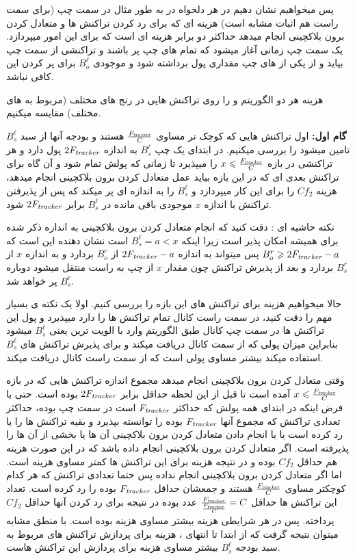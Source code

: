 پس میخواهیم نشان دهیم در هر \epoch دلخواه در  به طور مثال در سمت چپ (برای سمت راست هم اثبات مشابه است) هزینه ای که \on برای رد کردن تراکنش ها و متعادل کردن برون بلاکچینی انجام میدهد حداکثر دو برابر هزینه ای است که \off برای این امور میپردازد.
یک \epoch سمت چپ زمانی آغاز میشود که تمام \bucket های چپ پر باشند و تراکنشی از سمت چپ بیاید و از یکی از \bucket های چپ مقداری پول برداشته شود و موجودی 
$B_o^{\ell}$
برای پر کردن این \bucket کافی نباشد.

هزینه هر دو الگوریتم \off و \on را روی تراکنش هایی در رنج های مختلف (مربوط به \bucket های مختلف) مقایسه میکنیم.


\textbf{گام اول:}
اول تراکنش هایی که کوچک تر مساوی
$\frac{F_{\textit{tracker}}}{C}$
هستند و بودجه آنها از سبد 
$B_s^{\ell}$
تامین میشود را بررسی میکنیم. در ابتدای یک \epoch چپ
$B_s^{\ell}$
به اندازه 
$2F_{\textit{tracker}}$
پول دارد و هر تراکنشی در بازه 
$x \leqslant \frac{F_{\textit{tracker}}}{C}$
را میپذیرد تا زمانی که پولش تمام شود و آن گاه برای تراکنش بعدی ای که در این بازه بیاید عمل متعادل کردن برون بلاکچینی انجام میدهد، هزینه 
$Cf_2$
را برای این کار میپردازد و 
$B_s^{\ell}$
را به اندازه ای پر میکند که پس از پذیرفتن تراکنش با اندازه
$x$
موجودی باقی مانده در 
$B_s^{\ell}$
برابر
$2F_{\textit{tracker}}$
شود. 

نکته حاشیه ای : دقت کنید که انجام متعادل کردن برون بلاکچینی به اندازه ذکر شده برای \on همیشه امکان پذیر است زیرا اینکه
$B_s^{\ell} = a < x$
است نشان دهنده این است که 
$B_o^{r} \geqslant 2F_{\textit{tracker}} - a$
پس \on میتواند به اندازه
$2F_{\textit{tracker}} - a$
از 
$B_o^r$
بردارد و به اندازه 
$x$
از 
$B_s^r$
بردارد و بعد از پذیرش تراکنش چون مقدار 
$x$
از چپ به راست منتقل میشود دوباره 
$B_s^r$
پر خواهد شد.


حالا میخواهیم هزینه \off برای تراکنش های این بازه را بررسی کنیم. 
اولا یک نکته ی بسیار مهم را دقت کنید، در سمت راست کانال \on تمام تراکنش ها را دارد میپذیرد و پول این تراکنش ها در سمت چپ کانال طبق الگوریتم   وارد با الویت ترین \bucket یعنی 
$B_s^{\ell}$
میشود بنابراین میزان پولی که \on از سمت کانال دریافت میکند و برای پذیرش تراکنش های \bucket 
$B_s^{\ell}$
استفاده میکند بیشتر مساوی پولی است که \off از سمت راست کانال دریافت میکند.

وقتی \on متعادل کردن برون بلاکچینی انجام میدهد مجموع اندازه تراکنش هایی که در بازه
$x \leqslant \frac{F_{\textit{tracker}}}{C}$
آمده است تا قبل از این لحظه حداقل برابر 
$2F_{\textit{tracker}}$
بوده است. حتی با فرض اینکه \off در ابتدای \epoch همه پولش که حداکثر
$F_{\textit{tracker}}$
است در سمت چپ بوده، حداکثر تعدادی تراکنش که مجموع آنها
$F_{\textit{tracker}}$
بوده را توانسته بپذیرد و بقیه تراکنش ها را یا رد کرده است یا با انجام دادن متعادل کردن برون بلاکچینی آن ها یا بخشی از آن ها را پذیرفته است. اگر متعادل کردن برون بلاکچینی انجام داده باشد که در این صورت هزینه \off هم حداقل
$Cf_2$
بوده و در نتیجه هزینه \on برای این تراکنش ها کمتر مساوی هزینه \off است. اما اگر \off متعادل کردن برون بلاکچینی انجام نداده پس حتما تعدادی تراکنش که هر کدام کوچکتر مساوی
$\frac{F_{\textit{tracker}}}{C}$
هستند و جمعشان حداقل
$F_{\textit{tracker}}$
بوده را رد کرده است. تعداد این تراکنش ها حداقل 
$\frac{F_{\textit{tracker}}}{\frac{F_{\textit{tracker}}}{C}}=C$
عدد بوده در نتیجه \off برای رد کردن آنها حداقل
$Cf_2$
پرداخته. پس در هر شرایطی هزینه \off بیشتر مساوی هزینه \on بوده است. با منطق مشابه میتوان نتیجه گرفت که از ابتدا تا انتهای \epoch، هزینه \off برای پردازش تراکنش های مربوط به سبد بودجه
$B_s^{\ell}$
بیشتر مساوی هزینه \on برای پردازش این تراکنش هاست.


